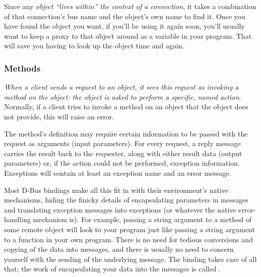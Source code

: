 \documentclass{myproc}
\begin{document}
Since any {\em object ``lives within'' the context of a connection\/}, it
takes a combination of that connection's bus name and the object's own name to
find  it. Once you have found the object you want, if you'll be using it again
soon, you'll usually want to keep a proxy to that object around as a variable
in your program. That will save you having to look up the object time and
again. 


 

\subsubsection{Methods}
{\em When a client sends a request to an object, it sees this request as
  invoking a method on the object: the object is asked to perform a specific,
  named action\/}. Normally, if a client tries to invoke a method on an object
that the 
object does not provide, this will raise an error. 

The method's definition may require certain information to be passed with the request as arguments (input parameters). For every request, a reply message carries the result back to the requester, along with either result data (output parameters) or, if the action could not be performed, exception information. Exceptions will contain at least an exception name and an error message.

Most D-Bus bindings make all this fit in with their environment's native
mechanisms, hiding the finicky details of encapsulating parameters in messages
and translating exception messages into exceptions (or whatever the native
error-handling mechanism is). For example, passing a string argument to a
method of some remote object will look to your program just like passing a
string argument to a function in your own program. There is no need for
tedious conversions and copying of the data into messages, and there is
usually no need to concern yourself with the sending of the underlying
message. The binding takes care of all that; the work of encapsulating your
data into the messages is called . 
\end{document}
